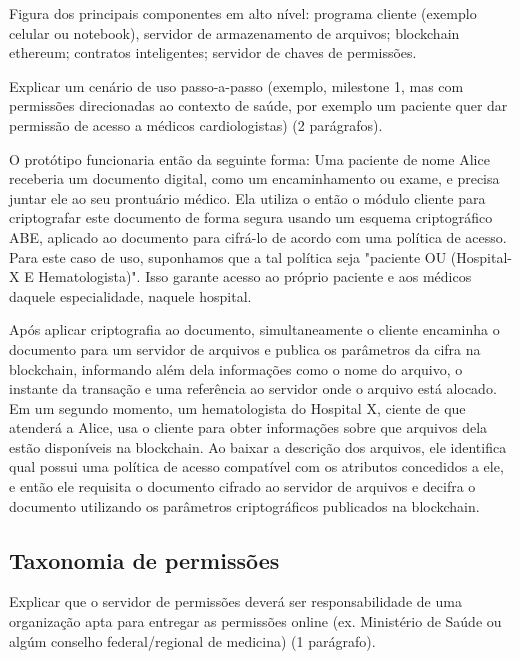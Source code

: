 \documentclass[a4paper,11pt]{article}
\begin{document}
{\color{ForestGreen}Figura dos principais componentes em alto nível: programa cliente (exemplo celular ou notebook), servidor de armazenamento de arquivos; blockchain ethereum; contratos inteligentes; servidor de chaves de permissões.} 

{\color{ForestGreen}Explicar um cenário de uso passo-a-passo (exemplo, milestone 1, mas com permissões direcionadas ao contexto de saúde, por exemplo um paciente quer dar permissão de acesso a médicos cardiologistas) (2 parágrafos)}. 

O protótipo funcionaria então da seguinte forma: Uma paciente de nome Alice receberia um documento digital, como um encaminhamento ou exame, e precisa juntar ele ao seu prontuário médico. Ela utiliza o então o módulo cliente para criptografar este documento de forma segura usando um esquema criptográfico ABE, aplicado ao documento para cifrá-lo de acordo com uma política de acesso. Para este caso de uso, suponhamos que a tal política seja "paciente OU (Hospital-X E Hematologista)". Isso garante acesso ao próprio paciente e aos médicos daquele especialidade, naquele hospital. 

Após aplicar criptografia ao documento, simultaneamente o cliente encaminha o documento para um servidor de arquivos e publica os parâmetros da cifra na blockchain, informando além dela informações como o nome do arquivo, o instante da transação e uma referência ao servidor onde o arquivo está alocado. Em um segundo momento, um hematologista do Hospital X, ciente de que atenderá a Alice, usa o cliente para obter informações sobre que arquivos dela estão disponíveis na blockchain. Ao baixar a descrição dos arquivos, ele identifica qual possui uma política de acesso compatível com os atributos concedidos a ele, e então ele requisita o documento cifrado ao servidor de arquivos e decifra o documento utilizando os parâmetros criptográficos publicados na blockchain.

\subsection{Taxonomia de permissões}

{\color{ForestGreen}Explicar que o servidor de permissões deverá ser responsabilidade de uma organização apta para entregar as permissões online (ex. Ministério de Saúde ou algúm conselho federal/regional de medicina) (1 parágrafo)}. 
\end{document}
